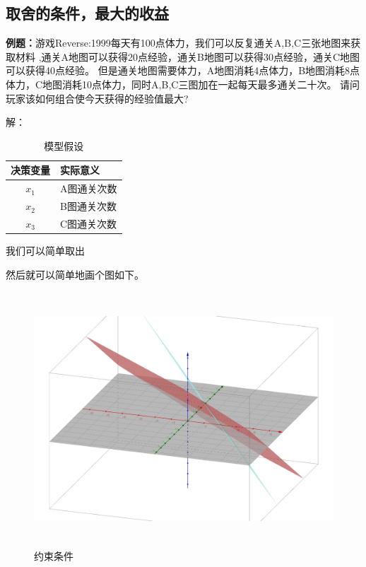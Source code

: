 \documentclass[a4paper,20pt]{article}
\begin{document}
\subsection{取舍的条件，最大的收益}
\par \textbf{例题：}游戏Reverse:1999每天有100点体力，我们可以反复通关A,B,C三张地图来获取材料
,通关A地图可以获得20点经验，通关B地图可以获得30点经验，通关C地图可以获得40点经验。
但是通关地图需要体力，A地图消耗4点体力，B地图消耗8点体力，C地图消耗10点体力，同时A,B,C三图加在一起每天最多通关二十次。
请问玩家该如何组合使今天获得的经验值最大?
\par \small{解：}
\begin{table}[H]

    \caption{模型假设}
    \centering
    \begin{tabular}{ c l }
        \hline
        决策变量 & 实际意义    \\
        \hline
        $x_1$    & A图通关次数 \\
        \hline
        $x_2$    & B图通关次数 \\
        \hline
        $x_3$    & C图通关次数 \\
        \hline
    \end{tabular}
\end{table}
我们可以简单取出  \par   {}
然后就可以简单地画个图如下。
\begin{figure}[H]
    \centering
    \includegraphics[width=340pt,height=270pt]{figure1.png}
    \caption{约束条件}
\end{figure}
\end{document}
